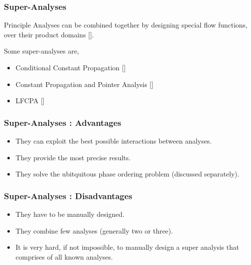 \begin{frame}
  \frametitle{Super-Analyses}

  \begin{block}{Principle}
      Analyses can be combined together by designing special flow functions, over their product domains [].
  \end{block}

  Some super-analyses are,
    \begin{itemize}
        \item Conditional Constant Propagation []
        \item Constant Propagation and Pointer Analysis []
        \item LFCPA []
    \end{itemize}

\end{frame}


\begin{frame}
  \frametitle{Super-Analyses : Advantages}

    \begin{itemize}
        \item They can exploit the best possible interactions between analyses.
        \item They provide the most precise results.
        \item They solve the ubitquitous phase ordering problem (discussed separately).
    \end{itemize}
\end{frame}


\begin{frame}
  \frametitle{Super-Analyses : Disadvantages}

    \begin{itemize}
        \item They have to be manually designed.
        \item They combine few analyses (generally two or three).
        \item It is very hard, if not impossible, to manually design a super analysis that comprises of all known analyses.
    \end{itemize}

\end{frame}




